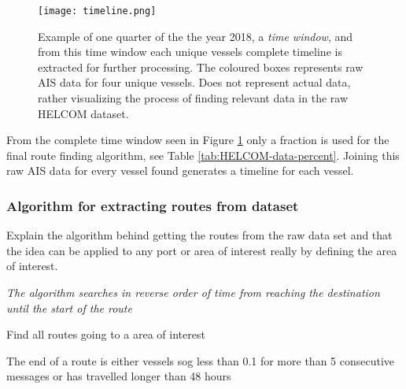 \documentclass[../main.tex]{subfiles}
\begin{document}
\begin{figure}[H]
	\centering
	\texttt{[image: timeline.png]}
	\caption{Example of one quarter of the the year 2018, a \textit{time window}, and from this time window each unique vessels complete timeline is extracted for further processing. The coloured boxes represents raw AIS data for four unique vessels. Does not represent actual data, rather visualizing the process of finding relevant data in the raw HELCOM dataset.}
	\label{fig:timeline}
\end{figure}

From the complete time window seen in Figure \ref{fig:timeline} only a fraction is used for the final route finding algorithm, see Table \ref{tab:HELCOM-data-percent}. Joining this raw AIS data for every vessel found generates a timeline for each vessel.

\subsubsection{Algorithm for extracting routes from dataset}

Explain the algorithm behind getting the routes from the raw data set and that the idea can be applied to any port or area of interest really by defining the area of interest.

\begin{algorithm}[H]
\SetAlgoNoLine
\SetAlgoNoEnd

\emph{The algorithm searches in reverse order of time from reaching the destination until the start of the route}\;
\BlankLine
{}
\caption{Find all routes going to a area of interest}
\label{alg:search}
\end{algorithm}
\vspace*{5mm}
The end of a route is either vessels sog less than 0.1 for more than 5 consecutive messages or has travelled longer than 48 hours
\end{document}
